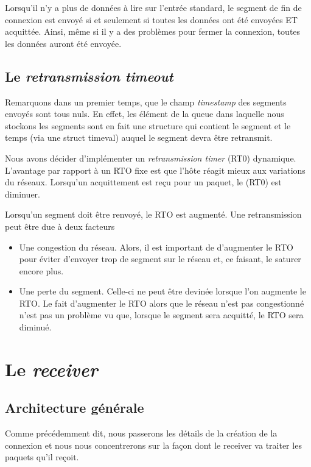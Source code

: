 \documentclass[12pt,notitlepage]{report}
\begin{document}
	Lorsqu'il n'y a plus de données à lire sur l'entrée standard, le segment de fin de connexion est envoyé si et seulement si toutes les données ont été envoyées ET acquittée. Ainsi, même si il y a des problèmes pour fermer la connexion, toutes les données auront été envoyée.
	
	\subsection{Le \textit{retransmission timeout}}
	
	Remarquons dans un premier temps, que le champ \textit{timestamp} des segments envoyés sont tous nuls. En effet, les élément de la queue dans laquelle nous stockons les segments sont en fait une structure qui contient le segment et le temps (via une struct timeval) auquel le segment devra être retransmit.
	
	Nous avons décider d'implémenter un \textit{retransmission timer} (RT0) dynamique. L'avantage par rapport à un RTO fixe est que l'hôte réagit mieux aux variations du réseaux. Lorsqu'un acquittement est reçu pour un paquet, le (RT0) est diminuer. 
	
	Lorsqu'un segment doit être renvoyé, le RTO est augmenté. Une retransmission peut être due à deux facteurs
	\begin{itemize}
		\item Une congestion du réseau. Alors, il est important de d'augmenter le RTO pour éviter d'envoyer trop de segment sur le réseau et, ce faisant, le saturer encore plus.
		\item Une perte du segment. Celle-ci ne peut être devinée lorsque l'on augmente le RTO. Le fait d'augmenter le RTO alors que le réseau n'est pas congestionné n'est pas un problème vu que, lorsque le segment sera acquitté, le RTO sera diminué.
	\end{itemize}
	
\section{Le \textit{receiver}}
	\subsection{Architecture générale}
	Comme précédemment dit, nous passerons les détails de la création de la connexion et nous nous concentrerons sur la façon dont le receiver va traiter les paquets qu'il reçoit.
	
\end{document}
